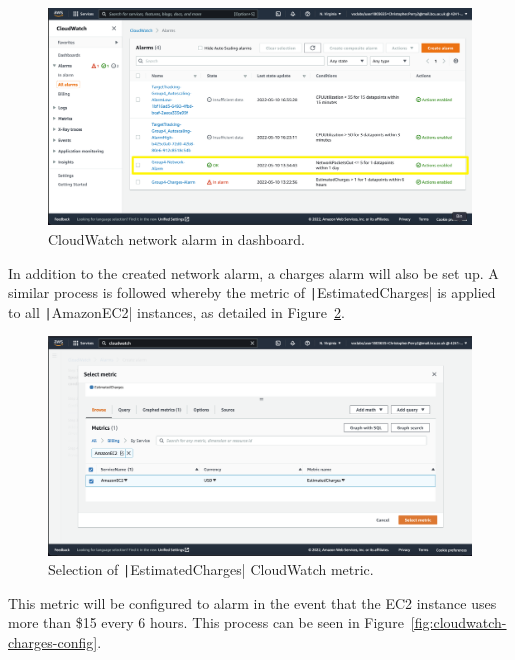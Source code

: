 \begin{figure}[!htbp]
    \centering
    \includegraphics[width=\textwidth]{resources/cloudwatch/cloudwatch-network-alarm-complete}
    \caption{CloudWatch network alarm in dashboard.}
    \label{fig:cloudwatch-network-alarm}
\end{figure}

In addition to the created network alarm, a charges alarm will also be set up.
A similar process is followed whereby the metric of \texttt|EstimatedCharges| is applied to all
\texttt|AmazonEC2| instances, as detailed in Figure~\ref{fig:cloudwatch-metric-charges}.

\begin{figure}[!htbp]
    \centering
    \includegraphics[width=\textwidth]{resources/cloudwatch/cloudwatch-metric-charges}
    \caption{Selection of \texttt|EstimatedCharges| CloudWatch metric.}
    \label{fig:cloudwatch-metric-charges}
\end{figure}

\clearpage
This metric will be configured to alarm in the event that the EC2 instance uses more than \$15 every 6 hours.
This process can be seen in Figure~\ref{fig:cloudwatch-charges-config}.

